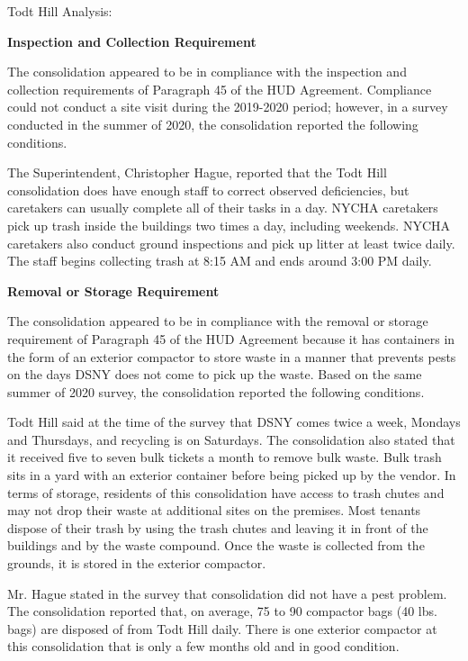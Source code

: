 Todt Hill Analysis: 

\textbf{Inspection and Collection Requirement} 

 

The consolidation appeared to be in compliance with the inspection and collection requirements of Paragraph 45 of the HUD Agreement. Compliance could not conduct a site visit during the 2019-2020 period; however, in a survey conducted in the summer of 2020, the consolidation reported the following conditions.

The Superintendent, Christopher Hague, reported that the Todt Hill consolidation does have enough staff to correct observed deficiencies, but caretakers can usually complete all of their tasks in a day. NYCHA caretakers pick up trash inside the buildings two times a day, including weekends. NYCHA caretakers also conduct ground inspections and pick up litter at least twice daily. The staff begins collecting trash at 8:15 AM and ends around 3:00 PM daily.

\textbf{Removal or Storage Requirement} 

The consolidation appeared to be in compliance with the removal or storage requirement of Paragraph  45 of the HUD Agreement because it has containers in the form of an exterior compactor to store waste in a manner that prevents pests on the days DSNY does not come to pick up the waste. Based on the same summer of  2020  survey, the consolidation reported the following conditions.

  

Todt Hill said at the time of the survey that DSNY comes twice a week, Mondays and Thursdays, and recycling is on Saturdays. The consolidation also stated that it received five to seven bulk tickets a month to remove bulk waste.  Bulk trash sits in a yard with an exterior container before being picked up by the vendor.  In terms of storage, residents of this consolidation have access to trash chutes and may not drop their waste at additional sites on the premises. Most tenants dispose of their trash by using the trash chutes and leaving it in front of the buildings and by the waste compound. Once the waste is collected from the grounds, it is stored in the exterior compactor.  

 

Mr. Hague stated in the survey that consolidation did not have a pest problem. The consolidation reported that, on average, 75 to 90 compactor bags (40 lbs. bags)  are disposed of from Todt Hill daily. There is one exterior compactor at this consolidation that is only a few months old and in good condition. 


